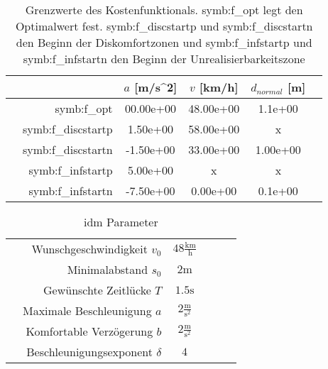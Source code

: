\begin{table}[!htbp]
    \centering
    \begin{tabular}{crSSSS}
        \hline
        & & \(a\)  [m/s\textasciicircum 2] & \( v\) [km/h] & \(d_{normal}\) [m] \\%
        \hline
         & \gls{symb:f_opt} & 00.00e+00 & 48.00e+00 & 1.1e+00\\
         & \gls{symb:f_discstartp} & 1.50e+00 & 58.00e+00 & x \\
         & \gls{symb:f_discstartn} & -1.50e+00 & 33.00e+00 & 1.00e+00\\
         & \gls{symb:f_infstartp} & 5.00e+00 & x & x \\
         & \gls{symb:f_infstartn} & -7.50e+00 & 0.00e+00 & 0.1e+00\\
          \hline
    \end{tabular}
    \caption[Grenzwerte des Kostenfunktionals]{Grenzwerte des Kostenfunktionals. \gls{symb:f_opt} legt den Optimalwert fest. \gls{symb:f_discstartp} und \gls{symb:f_discstartn} den Beginn der Diskomfortzonen und \gls{symb:f_infstartp} und \gls{symb:f_infstartn} den Beginn der Unrealisierbarkeitszone
    }\label{tab:Kostfunc}
\end{table}



\begin{table}[!htbp]
    \centering
    \begin{tabular}{crSSSS}
        \hline
        & Wunschgeschwindigkeit \( v_{0} \) & \( 48  \mathrm{\frac{km}{h}}\)\\
        & Minimalabstand \(s_{0}\) & \(2\mathrm{m}\)\\
        & Gew\"unschte Zeitl\"ucke \( T \) & \(1.5\mathrm{s}\) \\
        & Maximale Beschleunigung \( a \) & \(2\mathrm{\frac{m}{s^2}}\) \\
        & Komfortable Verz\"ogerung \( b \) & \(2\mathrm{\frac{m}{s^2}}\) \\
        & Beschleunigungsexponent \( \delta \) & \(4\)\\
        
         \hline
    \end{tabular}
    \caption[IDM Parameter]{\gls{idm} Parameter
    }\label{tab:IDMpara}
\end{table}


